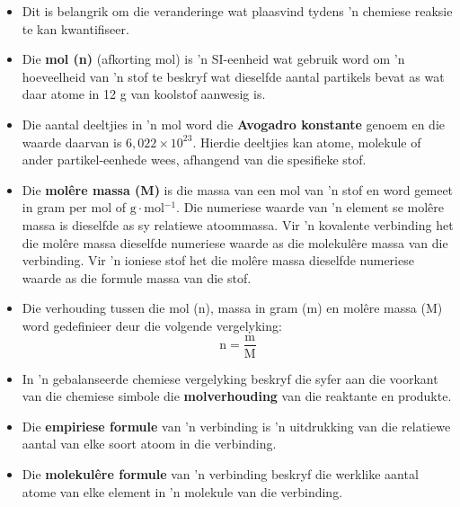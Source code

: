 {}
            \nopagebreak
      \label{m38712*id285735}\begin{itemize}[noitemsep]
\item Dit is belangrik om die veranderinge wat plaasvind tydens 'n chemiese reaksie te kan kwantifiseer.
\item Die \textbf{mol (n)} (afkorting mol) is 'n SI-eenheid wat gebruik word om 'n hoeveelheid van  'n stof te beskryf wat dieselfde aantal partikels bevat as wat daar atome in 12 g van koolstof aanwesig is.
\item Die aantal deeltjies in 'n mol word die \textbf{Avogadro konstante} genoem  en die waarde daarvan is $6,022 \times {10}^{23}$. Hierdie deeltjies kan atome, molekule of ander partikel-eenhede wees, afhangend van die spesifieke stof.
\item Die \textbf{mol\^{e}re massa (M)} is die massa van een mol van 'n stof en word gemeet in gram per mol of $\text{g} \cdot \text{mol}{}^{-1}$. Die numeriese waarde van 'n element se molêre massa is dieselfde as sy relatiewe atoommassa. Vir 'n kovalente verbinding het die molêre massa dieselfde numeriese waarde as die molekulêre massa van die verbinding. Vir 'n ioniese stof het die molêre massa dieselfde numeriese waarde as die formule massa van die stof.
\item Die verhouding tussen die mol (n), massa in gram (m) en molêre massa (M) word gedefinieer deur die volgende vergelyking:
\label{m38712*id285862}\nopagebreak\noindent{}
    \begin{equation*}
    \text{n}=\frac{\text{m}}{\text{M}}
      \end{equation*}
\item In 'n gebalanseerde chemiese vergelyking beskryf die syfer aan die voorkant van die chemiese simbole die \textbf{molverhouding} van die reaktante en produkte.
\item Die \textbf{empiriese formule} van 'n verbinding is 'n uitdrukking van die relatiewe aantal van elke soort atoom in die verbinding.
\item Die \textbf{molekul\^{e}re formule} van 'n verbinding beskryf die werklike aantal atome van elke element in 'n molekule van die verbinding.

\end{itemize}
